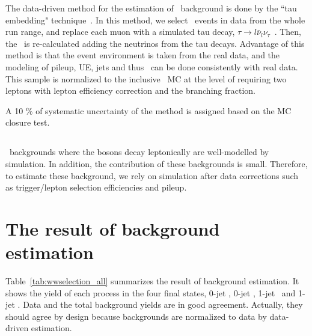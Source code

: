 The data-driven method for the estimation of \ztt\ background is done by the 
``tau embedding" technique~\cite{Chatrchyan:2014nva}. 
In this method, we select \dymm\ events in data
from the whole run range, 
and replace each muon with a simulated tau decay, 
$\tau \rightarrow l\bar{\nu}_l\nu_\tau$~\cite{Jadach:1990mz}. 
Then, the \met\ is re-calculated adding the neutrinos from the tau decays. 
Advantage of this method is that the event environment is taken from the real data, 
and the modeling of pileup, UE, jets and thus \met\ can be done consistently 
with real data. This sample is normalized to the inclusive \ztt\ MC 
at the level of requiring two leptons with lepton efficiency correction
and the branching fraction.

A 10 \% of systematic uncertainty of the method is assigned based on the MC closure test. 

\subsection{\vv} 

\vv\ backgrounds where the bosons decay leptonically are well-modelled by simulation.
In addition, the contribution of these backgrounds is small. Therefore, to estimate these 
background, we rely on simulation after data corrections 
such as trigger/lepton selection efficiencies and pileup.  



\section{ The result of background estimation }

Table~\ref{tab:wwselection_all} summarizes the result of background estimation. 
It shows the yield of each process in the four final states, 0-jet \SF, 0-jet \DF,  
1-jet \SF\ and 1-jet \DF. Data and the total background yields are in good agreement. 
Actually, they should agree by design because backgrounds are normalized to data
by data-driven estimation. 

